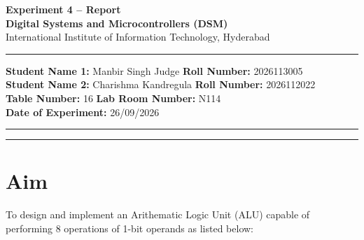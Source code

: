\documentclass[11pt, a4paper]{article}
\begin{document}
\thispagestyle{no_hdr_border_rule}

\begin{center}
    {\Large \textbf{Experiment 4 -- Report}} \\[0.2cm]
    {\large \textbf{Digital Systems and Microcontrollers (DSM)}} \\[0.1cm]
    {\normalsize International Institute of Information Technology, Hyderabad} \\[0.3cm]
\end{center}

\vspace{0.2cm}
\hrule
\vspace{0.4cm}

\noindent \textbf{Student Name 1:} Manbir Singh Judge \hfill \textbf{Roll Number:} 2026113005 \\
\noindent \textbf{Student Name 2:} Charishma Kandregula \hfill \textbf{Roll Number:} 2026112022 \\
\noindent \textbf{Table Number:} 16 \hfill \textbf{Lab Room Number:} N114 \\
\noindent \textbf{Date of Experiment:} 26/09/2026

\vspace{0.4cm}
\hrule
\vspace{0.5cm}

\vspace{1em}

\tableofcontents
\vspace{0.5cm}
\hrule
\vspace{0.8cm}

\newpage
{}


\section{Aim}

To design and implement an Arithematic Logic Unit (ALU) capable of performing 8 operations of 1-bit operands as listed below:
\end{document}
